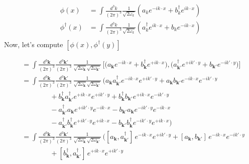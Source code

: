 \documentclass[12pt]{article}
\begin{document}
\begin{align*}
   \phi(x) &= \int \frac{d^3k}{(2\pi)^3} \frac{1}{\sqrt{2\omega_k}} \left(
   a_k e^{-ik\cdot x} + b_k^{\dagger}e^{ik\cdot x}
   \right) \\
   \phi^{\dagger}(x) &= \int \frac{d^3k}{(2\pi)^3} \frac{1}{\sqrt{2\omega_k}}
   \left( a^{\dagger}_k e^{ik\cdot x} + b_k e^{-ik\cdot x} \right) \\
\end{align*}
Now, let's compute $[\phi(x), \phi^{\dagger}(y)]$

\begin{align*}
   [\phi(x),\phi^\dagger(y)]
   &=\int \frac{d^3\mathbf{k}}{(2\pi)^3}
          \frac{d^3\mathbf{k}'}{(2\pi)^3}\,
          \frac{1}{\sqrt{2\omega_{\mathbf{k}}}
                   \sqrt{2\omega_{\mathbf{k}'}}}\,
   \Big[
     \big(a_{\mathbf{k}} e^{-ik\cdot x}
      + b_{\mathbf{k}}^\dagger e^{+ik\cdot x}\big),
     \big(a_{\mathbf{k}'}^\dagger e^{+ik'\cdot y}
      + b_{\mathbf{k}'} e^{-ik'\cdot y}\big)
   \Big] \\[6pt]
   &=\int \frac{d^3\mathbf{k}}{(2\pi)^3}
           \frac{d^3\mathbf{k}'}{(2\pi)^3}\,
           \frac{1}{\sqrt{2\omega_{\mathbf{k}}}
                    \sqrt{2\omega_{\mathbf{k}'}}}\,
   \Big(
     a_{\mathbf{k}} a_{\mathbf{k}'}^\dagger e^{-ik\cdot x} e^{+ik'\cdot y}
    +a_{\mathbf{k}} b_{\mathbf{k}'} e^{-ik\cdot x} e^{-ik'\cdot y} \\
   &\qquad\qquad
    +b_{\mathbf{k}}^\dagger a_{\mathbf{k}'}^\dagger e^{+ik\cdot x} e^{+ik'\cdot y}
    +b_{\mathbf{k}}^\dagger b_{\mathbf{k}'} e^{+ik\cdot x} e^{-ik'\cdot y} \\
   &\qquad\qquad
    -a_{\mathbf{k}'}^\dagger a_{\mathbf{k}} e^{+ik'\cdot y} e^{-ik\cdot x}
    -b_{\mathbf{k}'} a_{\mathbf{k}} e^{-ik'\cdot y} e^{-ik\cdot x} \\
   &\qquad\qquad
    -a_{\mathbf{k}'}^\dagger b_{\mathbf{k}}^\dagger e^{+ik'\cdot y} e^{+ik\cdot x}
    -b_{\mathbf{k}'} b_{\mathbf{k}}^\dagger e^{-ik'\cdot y} e^{+ik\cdot x}
   \Big) \\[6pt]
   &=\int \frac{d^3\mathbf{k}}{(2\pi)^3}
           \frac{d^3\mathbf{k}'}{(2\pi)^3}\,
           \frac{1}{\sqrt{2\omega_{\mathbf{k}}}
                    \sqrt{2\omega_{\mathbf{k}'}}}\,
   \Big(
    [a_{\mathbf{k}},a_{\mathbf{k}'}^\dagger]\,e^{-ik\cdot x}e^{+ik'\cdot y}
    +[a_{\mathbf{k}},b_{\mathbf{k}'}]\,e^{-ik\cdot x}e^{-ik'\cdot y} \\
   &\qquad\qquad
    +[b_{\mathbf{k}}^\dagger,a_{\mathbf{k}'}^\dagger]\,e^{+ik\cdot x}e^{+ik'\cdot y}

\end{align*}
\end{document}

